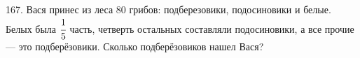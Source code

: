 167. Вася принес из леса 80 грибов: подберезовики, подосиновики и белые. Белых была $\cfrac{1}{5}$ часть, четверть остальных составляли подосиновики, а все прочие --- это подберёзовики. Сколько подберёзовиков нашел Вася?\\
